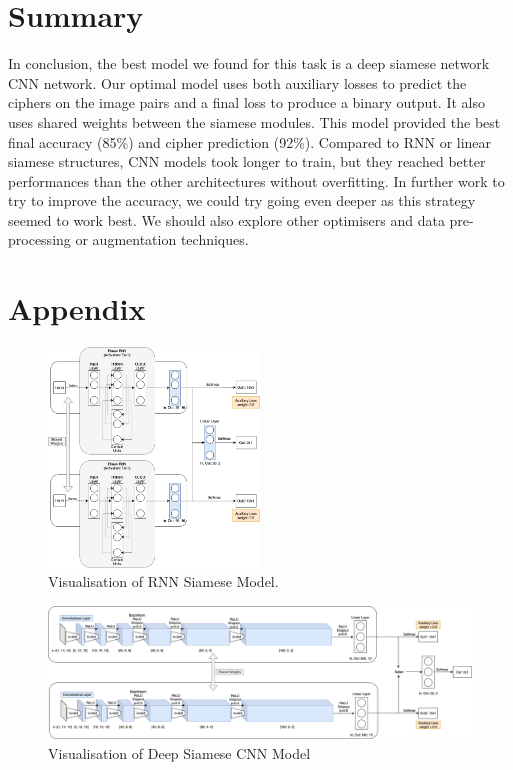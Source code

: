 \documentclass[10pt,conference,compsocconf]{IEEEtran}
\begin{document}
\section{Summary}
In conclusion, the best model we found for this task is a deep siamese network CNN network. Our optimal model uses both auxiliary losses to predict the ciphers on the image pairs and a final loss to produce a binary output. It also uses shared weights between the siamese modules. This model provided the best final accuracy (85\%) and cipher  prediction (92\%). Compared to RNN or linear siamese structures, CNN models took longer to train, but they reached better performances than the other architectures without overfitting. In further work to try to improve the accuracy, we could try going even deeper as this strategy seemed to work best. We should also explore other optimisers and data pre-processing or augmentation techniques.  

%
%
\newpage
\onecolumn 
\section{Appendix}
\begin{figure}[htbp]
  \centering
  \includegraphics[width=0.5\textwidth]{doc/project1-report/siamese_rnn.png}
  \vspace{-3mm}
  \caption{Visualisation of RNN Siamese Model.}
  \label{fig:siamese6}
\end{figure}

\begin{figure}[htbp]
  \centering
  \includegraphics[scale=0.35]{doc/project1-report/bestmodel.png}
  \vspace{-3mm}
  \caption{Visualisation of Deep Siamese CNN Model}
  \label{fig:best-performance}
\end{figure}
\end{document}
